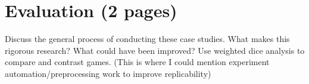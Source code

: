 \chapter{Evaluation (2 pages)} 

Discuss the general process of conducting these case studies. What makes this rigorous research? What could have been improved? Use weighted dice analysis to compare and contrast games. (This is where I could mention experiment automation/preprocessing work to improve replicability)

\Blindtext

\Blindtext
